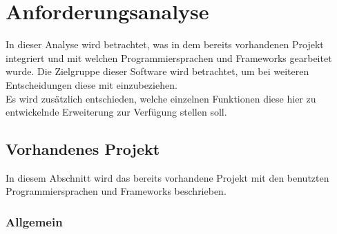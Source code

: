 \section{Anforderungsanalyse}
\label{sec03:anforderungen}

In dieser Analyse wird betrachtet, was in dem bereits vorhandenen Projekt integriert und mit welchen Programmiersprachen und Frameworks gearbeitet wurde. Die Zielgruppe dieser Software wird betrachtet, um bei weiteren Entscheidungen diese mit einzubeziehen. \\
Es wird zusätzlich entschieden, welche einzelnen Funktionen diese hier zu entwickelnde Erweiterung zur Verfügung stellen soll.

\subsection{Vorhandenes Projekt}
\label{subsec03:bereits_vorhanden_projekt}
In diesem Abschnitt wird das bereits vorhandene Projekt mit den benutzten Programmiersprachen und Frameworks beschrieben.

\subsubsection{Allgemein}
\label{subsubsec03:allgemein}

